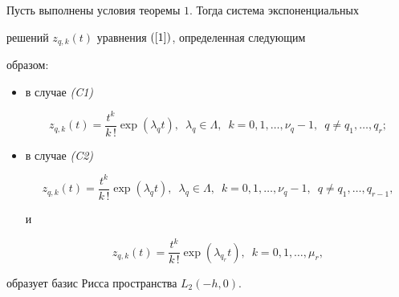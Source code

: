 \begin{lem} 


Пусть выполнены условия теоремы $1$. Тогда система экспоненциальных 


решений $z_{q,k}(t)$ уравнения $(\ref{1})$, определенная следующим 


образом$:$ 


\begin{itemize} 


\item[1)] в случае {\em (C1)} 


$$ 


z_{q,k}(t)=\frac{t^k}{k\,!}\exp(\lambda_q t),\ \;\lambda_q\in\Lambda, 


\ \; k=0,1,\dotsc,\nu_q-1,\ \; q\ne q_1,\dotsc,q_r; 


$$ 


\item[2)] в случае {\em (C2)} 


$$ 


z_{q,k}(t)=\frac{t^k}{k\,!}\exp(\lambda_q t),\ \;\lambda_q\in\Lambda, 


\ \; k=0,1,\dotsc,\nu_q-1,\ \; q\ne q_1,\dotsc,q_{r-1}, 


$$ 


и 


$$ 


z_{q,k}(t)=\frac{t^k}{k\,!}\exp(\lambda_{q_r} t), 


\ \; k=0,1,\dotsc,\mu_r, 


$$ 


\end{itemize} 


образует базис Рисса пространства $L_2(-h,0)$. 


\end{lem} 


 


